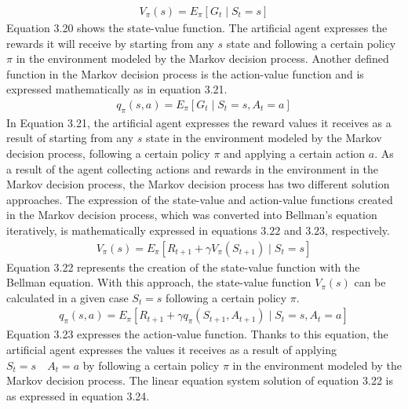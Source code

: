 \documentclass[12pt,twoside,a4]{mwbk}
\begin{document}
\begin{subequations}
\begin{align}
    V_{\pi}(s)=E_{\pi}\left[G_{t} \mid S_{t}=s\right]
\end{align}
\end{subequations}
Equation 3.20 shows the state-value function. The artificial agent expresses the rewards it will receive by starting from any $s$ state and following a certain policy $\pi$ in the environment modeled by the Markov decision process. Another defined function in the Markov decision process is the action-value function and is expressed mathematically as in equation 3.21.
\begin{subequations}
\begin{align}
    q_{\pi}(s, a)=E_{\pi}\left[G_{t} \mid S_{t}=s, A_{t}=a\right]
\end{align}
\end{subequations}
In Equation 3.21, the artificial agent expresses the reward values it receives as a result of starting from any $s$ state in the environment modeled by the Markov decision process, following a certain policy $\pi$ and applying a certain action $a$. As a result of the agent collecting actions and rewards in the environment in the Markov decision process, the Markov decision process has two different solution approaches. The expression of the state-value and action-value functions created in the Markov decision process, which was converted into Bellman's equation iteratively, is mathematically expressed in equations $3.22$ and $3.23$, respectively.
\begin{subequations}
\begin{align}
    V_{\pi}(s)=E_{\pi}\left[R_{t+1}+\gamma V_{\pi}\left(S_{t+1}\right) \mid S_{t}=s\right]
\end{align}
\end{subequations}
Equation 3.22 represents the creation of the state-value function with the Bellman equation. With this approach, the state-value function $V_{\pi}(s)$ can be calculated in a given case $S_{t}=s$ following a certain policy $\pi$.
\begin{subequations}
\begin{align}
   q_{\pi}(s, a)=E_{\pi}\left[R_{t+1}+\gamma q_{\pi}\left(S_{t+1}, A_{t+1}\right) \mid S_{t}=s, A_{t}=a\right]
\end{align}
\end{subequations}
Equation 3.23 expresses the action-value function. Thanks to this equation, the artificial agent expresses the values it receives as a result of applying $S_{t}=s \quad A_{t}=a$ by following a certain policy $\pi$ in the environment modeled by the Markov decision process. The linear equation system solution of equation 3.22 is as expressed in equation 3.24.
\end{document}
